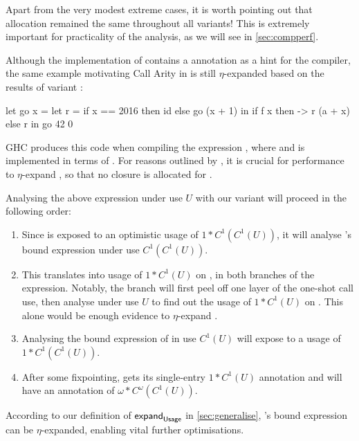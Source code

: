 Apart from the very modest extreme cases, it is worth pointing out that allocation remained the same throughout all variants!
This is extremely important for practicality of the analysis, as we will see in \cref{sec:compperf}.

Although the implementation of  contains a  annotation as a hint for the compiler, the same example motivating Call Arity in \textcite[Section~3.5.1]{callarity} is still $\eta$-expanded based on the results of variant \varedges:
\begin{haskellcode}
  let go x =
       let r = 
            if x == 2016
            then id 
            else go (x + 1)
       in if f x 
          then \a -> r (a + x)
          else r
  in go 42 0
\end{haskellcode}

GHC produces this code when compiling the expression , where  and  is implemented in terms of .
For reasons outlined by \textcite{callarity}, it is crucial for performance to $\eta$-expand , so that no closure is allocated for .

Analysing the above expression under use $U$ with our variant \varedges will proceed in the following order:

\begin{enumerate}
  \item Since  is exposed to an optimistic usage of $1*C^1(C^1(U))$, it will analyse 's bound expression under use $C^1(C^1(U))$.
  \item 
    This translates into usage of $1*C^1(U)$ on , in both branches of the  expression. 
    Notably, the  branch will first peel off one layer of the one-shot call use, then analyse  under use $U$ to find out the usage of $1*C^1(U)$ on .
    This alone would be enough evidence to $\eta$-expand .
  \item Analysing the bound expression of  in use $C^1(U)$ will expose  to a usage of $1*C^1(C^1(U))$. 
  \item After some fixpointing,  gets its single-entry $1*C^1(U)$ annotation and  will have an annotation of $\omega*C^\omega(C^1(U))$.
\end{enumerate}

According to our definition of $\mathsf{expand}_{\text{\textsf{Usage}}}$ in \cref{sec:generalise}, 's bound expression can be $\eta$-expanded, enabling vital further optimisations.


